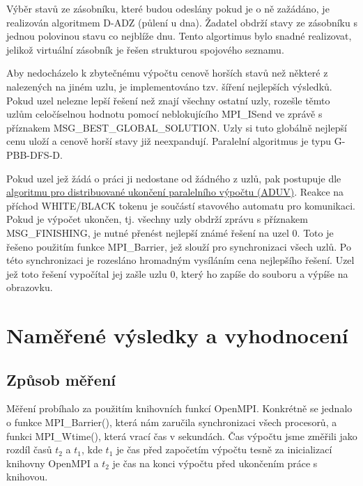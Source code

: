 \documentclass[12pt]{article}
\begin{document}
Výběr stavů ze zásobníku, které budou odeslány pokud je o ně zažádáno, je realizován algoritmem D-ADZ (půlení u dna). Žadatel obdrží stavy ze zásobníku s jednou polovinou stavu co nejblíže dnu. Tento algortimus bylo snadné realizovat, jelikož virtuální zásobník je řešen strukturou spojového seznamu.

Aby nedocházelo k zbytečnému výpočtu cenově horších stavů než některé z nalezených na jiném uzlu, je implementováno tzv. šíření nejlepších výsledků. Pokud uzel nelezne lepší řešení než znají všechny ostatní uzly, rozešle těmto uzlům celočíselnou hodnotu pomocí neblokujícího MPI\_ISend ve zprávě s příznakem MSG\_BEST\_GLOBAL\_SOLUTION. Uzly si tuto globálně nejlepší cenu uloží a cenově horší stavy již neexpandují. Paralelní algoritmus je typu G-PBB-DFS-D.

Pokud uzel jež žádá o práci ji nedostane od žádného z uzlů, pak postupuje dle \href{https://edux.fit.cvut.cz/courses/MI-PAR/labs/prohledavani_do_hloubky#algoritmus_pro_distribuovane_ukonceni_paralelniho_vypoctu_aduv}{algoritmu pro distribuované ukončení paralelního výpočtu (ADUV)}. Reakce na příchod WHITE/BLACK tokenu je součástí stavového automatu pro komunikaci. Pokud je výpočet ukončen, tj. všechny uzly obdrží zprávu s příznakem MSG\_FINISHING, je nutné přenést nejlepší známé řešení na uzel 0. Toto je řešeno použitím funkce MPI\_Barrier, jež slouží pro synchronizaci všech uzlů. Po této synchronizaci je rozesláno hromadným vysíláním cena nejlepšího řešení. Uzel jež toto řešení vypočítal jej zašle uzlu 0, který ho zapíše do souboru a výpíše na obrazovku. 

\section{Naměřené výsledky a vyhodnocení}
\subsection{Způsob měření}
Měření probíhalo za použitím knihovních funkcí OpenMPI. Konkrétně se jednalo o funkce MPI\_Barrier(), 
která nám zaručila synchronizaci všech procesorů, a funkci MPI\_Wtime(), která vrací čas v sekundách.
Čas výpočtu jsme změřili jako rozdíl časů \(t_2\) a \(t_1\), kde \(t_1\) je čas před započetím výpočtu
tesně za inicializací knihovny OpenMPI a \(t_2\) je čas na konci výpočtu před ukončením práce s knihovou.
\end{document}

